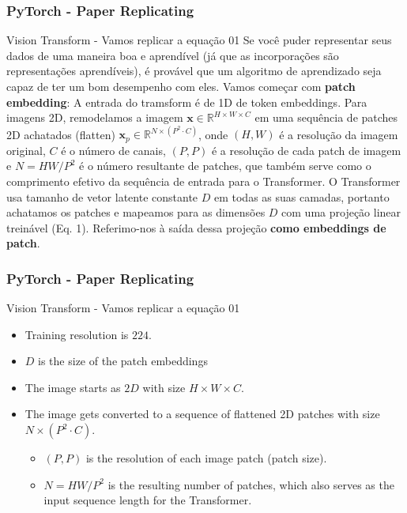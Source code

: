 \documentclass{beamer}
\begin{document}
\begin{frame}
	\frametitle{PyTorch - Paper Replicating}
	\begin{block}{Vision Transform - Vamos replicar a equação 01}
		Se você puder representar seus dados de uma maneira boa e aprendível (já que as incorporações são representações aprendíveis), é provável que um algoritmo de aprendizado seja capaz de ter um bom desempenho com eles. Vamos começar com \textbf{\textbf{patch embedding}}: 
		A entrada do tramsform é de 1D de token embeddings. Para imagens 2D, remodelamos a imagem $\mathbf{x} \in \mathbb{R}^{H \times W \times C}$ em uma sequência de patches 2D achatados (flatten) $\mathbf{x}_{p} \in \mathbb{R}^{N \times\left(P^{2} \cdot C\right)}$, onde $(H, W)$ é a resolução da imagem original, $C$ é o número de canais, $(P, P)$ é a resolução de cada patch de imagem e $N=H W / P^{2}$ é o número resultante de patches, que também serve como o comprimento efetivo da sequência de entrada para o Transformer. O Transformer usa tamanho de vetor latente constante $D$ em todas as suas camadas, portanto achatamos os patches e mapeamos para as dimensões $D$ com uma projeção linear treinável (Eq. 1). Referimo-nos à saída dessa projeção \textbf{como embeddings de patch}.
	\end{block}
\end{frame}
\begin{frame}
	\frametitle{PyTorch - Paper Replicating}
	\begin{block}{Vision Transform - Vamos replicar a equação 01}
		\begin{itemize}
			\item Training resolution is $224$.
			\item $D$  is the size of the patch embeddings
			\item The image starts as $2D$ with size  $H×W×C$.
			\item The image gets converted to a sequence of flattened 2D patches with size ${N \times\left(P^{2} \cdot C\right)}$.
			\begin{itemize}
				\item $(P, P)$ is the resolution of each image patch (patch size).
				\item $N=H W / P^{2}$ is the resulting number of patches, which also serves as the input sequence length for the Transformer.
			\end{itemize}
			
		\end{itemize}
	\end{block}
\end{frame}
\end{document}
